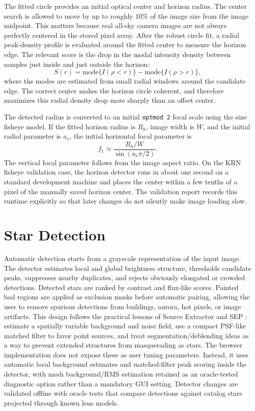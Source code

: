 \documentclass[11pt]{article}
\begin{document}
The fitted circle provides an initial optical center and horizon radius. The
center search is allowed to move by up to roughly \(10\%\) of the image size
from the image midpoint. This matters because real all-sky camera images are
not always perfectly centered in the stored pixel array. After the robust
circle fit, a radial peak-density profile is evaluated around the fitted center
to measure the horizon edge. The relevant score is the drop in the modal
intensity density between samples just inside and just outside the horizon:
\begin{equation}
  S(r) =
  \mathrm{mode}\{I(\rho < r)\} -
  \mathrm{mode}\{I(\rho > r)\},
\end{equation}
where the modes are estimated from small radial windows around the candidate
edge. The correct center makes the horizon circle coherent, and therefore
maximizes this radial density drop more sharply than an offset center.

The detected radius is converted to an initial \texttt{optmod 2} focal scale
using the sine fisheye model. If the fitted horizon radius is \(R_h\), image
width is \(W\), and the initial radial parameter is \(a_r\), the initial
horizontal focal parameter is
\begin{equation}
  f_1 \approx \frac{R_h/W}{\sin(a_r\pi/2)}.
\end{equation}
The vertical focal parameter follows from the image aspect ratio. On the KRN
fisheye validation case, the horizon detector runs in about one second on a
standard development machine and places the center within a few tenths of a
pixel of the manually saved horizon center. The validation report records this
runtime explicitly so that later changes do not silently make image loading
slow.

\section{Star Detection}

Automatic detection starts from a grayscale representation of the input image.
The detector estimates local and global brightness structure, thresholds
candidate peaks, suppresses nearby duplicates, and rejects obviously elongated
or crowded detections. Detected stars are ranked by contrast and flux-like
scores. Painted bad regions are applied as exclusion masks before automatic
pairing, allowing the user to remove spurious detections from buildings,
aurora, hot pixels, or image artifacts.
This design follows the practical lessons of Source Extractor
\cite{bertin1996sextractor} and SEP \cite{barbary2016sep}: estimate a
spatially variable background and noise field, use a compact PSF-like matched
filter to favor point sources, and treat segmentation/deblending ideas as a way
to prevent extended structures from masquerading as stars. The browser
implementation does not expose these as user tuning parameters. Instead, it
uses automatic local background estimates and matched-filter peak scoring
inside the detector, with mesh background/RMS estimation retained as an
oracle-tested diagnostic option rather than a mandatory GUI setting. Detector
changes are validated offline with oracle tests that compare detections against
catalog stars projected through known lens models.
\end{document}
